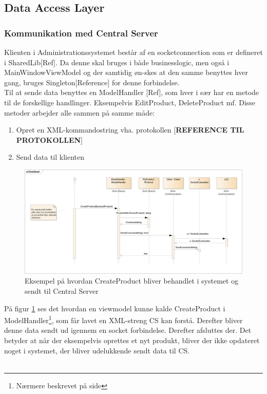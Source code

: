 \subsection{Data Access Layer}




\subsubsection{Kommunikation med Central Server}
Klienten i Administrationssystemet består af en socketconnection som er defineret i SharedLib[Ref]. Da denne skal bruges i både businesslogic, men også i MainWindowViewModel og der samtidig øn-skes at den samme benyttes hver gang, bruges Singleton[Reference] for denne forbindelse. \\
Til at sende data benyttes en ModelHandler [Ref], som hver i sær har en metode til de forskellige handlinger. Eksempelvis EditProduct, DeleteProduct mf. Disse metoder arbejder alle sammen på samme måde:
\begin{enumerate}
\item Opret en XML-kommandostring vha. protokollen [\textbf{REFERENCE TIL PROTOKOLLEN}]
\item Send data til klienten
\end{enumerate}


\begin{figure}[!h]
    \centering
    \includegraphics[width=1\textwidth]{Systemdesign/backend/Images/DataSend.png}
    \caption{Eksempel på hvordan CreateProduct bliver behandlet i systemet og sendt til Central Server}
    \label{fig:CreateSend}
\end{figure}

På figur \ref{fig:CreateSend} ses det hvordan en viewmodel kunne kalde CreateProduct i ModelHandler\footnote{Nærmere beskrevet på side \pageref{Modelhandler_Beskrivelse}}, som får lavet en XML-streng \gls{CS} kan forstå. Derefter bliver denne data sendt ud igennem en socket forbindelse.
Derefter afsluttes der. Det betyder at når der eksempelvis oprettes et nyt produkt, bliver der ikke opdateret noget i systemet, der bliver udelukkende sendt data til \gls{CS}.\\\\


